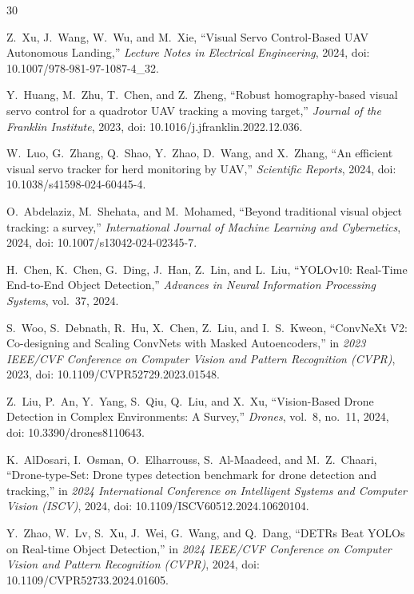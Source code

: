 \documentclass[journal]{IEEEtran}
\begin{document}
\begin{thebibliography}{30}

Z.~Xu, J.~Wang, W.~Wu, and M.~Xie, ``Visual Servo Control-Based UAV Autonomous Landing,'' \emph{Lecture Notes in Electrical Engineering}, 2024, doi: 10.1007/978-981-97-1087-4\_32.

Y.~Huang, M.~Zhu, T.~Chen, and Z.~Zheng, ``Robust homography-based visual servo control for a quadrotor UAV tracking a moving target,'' \emph{Journal of the Franklin Institute}, 2023, doi: 10.1016/j.jfranklin.2022.12.036.

W.~Luo, G.~Zhang, Q.~Shao, Y.~Zhao, D.~Wang, and X.~Zhang, ``An efficient visual servo tracker for herd monitoring by UAV,'' \emph{Scientific Reports}, 2024, doi: 10.1038/s41598-024-60445-4.

O.~Abdelaziz, M.~Shehata, and M.~Mohamed, ``Beyond traditional visual object tracking: a survey,'' \emph{International Journal of Machine Learning and Cybernetics}, 2024, doi: 10.1007/s13042-024-02345-7.

H.~Chen, K.~Chen, G.~Ding, J.~Han, Z.~Lin, and L.~Liu, ``YOLOv10: Real-Time End-to-End Object Detection,'' \emph{Advances in Neural Information Processing Systems}, vol.~37, 2024.

S.~Woo, S.~Debnath, R.~Hu, X.~Chen, Z.~Liu, and I.~S.~Kweon, ``ConvNeXt V2: Co-designing and Scaling ConvNets with Masked Autoencoders,'' in \emph{2023 IEEE/CVF Conference on Computer Vision and Pattern Recognition (CVPR)}, 2023, doi: 10.1109/CVPR52729.2023.01548.

Z.~Liu, P.~An, Y.~Yang, S.~Qiu, Q.~Liu, and X.~Xu, ``Vision-Based Drone Detection in Complex Environments: A Survey,'' \emph{Drones}, vol.~8, no.~11, 2024, doi: 10.3390/drones8110643.

K.~AlDosari, I.~Osman, O.~Elharrouss, S.~Al-Maadeed, and M.~Z.~Chaari, ``Drone-type-Set: Drone types detection benchmark for drone detection and tracking,'' in \emph{2024 International Conference on Intelligent Systems and Computer Vision (ISCV)}, 2024, doi: 10.1109/ISCV60512.2024.10620104.

Y.~Zhao, W.~Lv, S.~Xu, J.~Wei, G.~Wang, and Q.~Dang, ``DETRs Beat YOLOs on Real-time Object Detection,'' in \emph{2024 IEEE/CVF Conference on Computer Vision and Pattern Recognition (CVPR)}, 2024, doi: 10.1109/CVPR52733.2024.01605.


\end{thebibliography}
\end{document}
